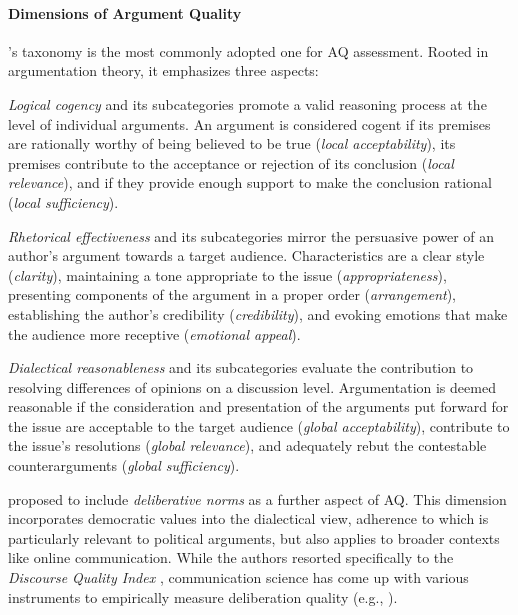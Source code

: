 \paragraph{Dimensions of Argument Quality}
\label{subsec:AQ}

\citet{wachsmuth-etal-2017-computational}'s taxonomy is the most commonly adopted one for AQ assessment. Rooted in argumentation theory, it emphasizes three aspects:

\textit{Logical cogency} and its subcategories promote a valid reasoning process at the level of individual arguments. An argument is considered cogent if its premises are rationally worthy of being believed to be true (\textit{local acceptability}), its premises contribute to the acceptance or rejection of its conclusion (\textit{local relevance}), and if they provide enough support to make the conclusion rational (\textit{local sufficiency}).

\textit{Rhetorical effectiveness} and its subcategories mirror the persuasive power of an author's argument towards a target audience. Characteristics are a clear style (\textit{clarity}), maintaining a tone appropriate to the issue (\textit{appropriateness}), presenting components of the argument in a proper order (\textit{arrangement}), establishing the author's credibility (\textit{credibility}), and evoking emotions that make the audience more receptive (\textit{emotional appeal}).

\textit{Dialectical reasonableness} and its subcategories evaluate the contribution to resolving differences of opinions on a discussion level. Argumentation is deemed reasonable if the consideration and presentation of the arguments put forward for the issue are acceptable to the target audience (\textit{global acceptability}), contribute to the issue's resolutions (\textit{global relevance}), and adequately rebut the contestable counterarguments (\textit{global sufficiency}).

\citet{vecchi-etal-2021-towards} proposed to include \textit{deliberative norms} as a further aspect of AQ. This dimension incorporates democratic values into the dialectical view, adherence to which is particularly relevant to political arguments, but also applies to broader contexts like online communication. While the authors resorted specifically to the \emph{Discourse Quality Index} \cite{steenbergen2003dqi}, communication science has come up with various instruments to empirically measure deliberation quality (e.g., \citealt{stromer-galley2011deliberation, black2011deliberation, graham2003deliberation}). 

